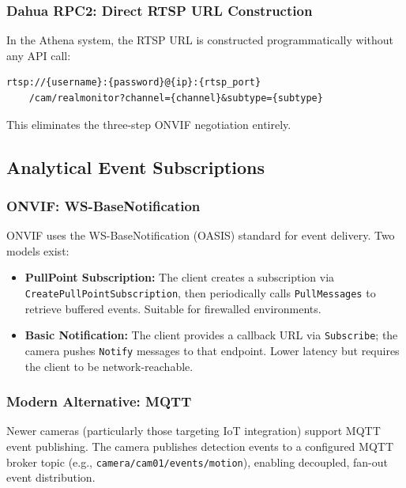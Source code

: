 \documentclass[12pt,a4paper]{article}
\begin{document}
\subsubsection{Dahua RPC2: Direct RTSP URL Construction}
In the Athena system, the RTSP URL is constructed programmatically without any API call:
\begin{lstlisting}[style=jsonstyle, caption=Programmatic RTSP URL Construction (Python)]
rtsp://{username}:{password}@{ip}:{rtsp_port}
    /cam/realmonitor?channel={channel}&subtype={subtype}
\end{lstlisting}
This eliminates the three-step ONVIF negotiation entirely.

\subsection{Analytical Event Subscriptions}

\subsubsection{ONVIF: WS-BaseNotification}
ONVIF uses the WS-BaseNotification (OASIS) standard for event delivery. Two models exist:
\begin{itemize}
    \item \textbf{PullPoint Subscription:} The client creates a subscription via \texttt{CreatePullPointSubscription}, then periodically calls \texttt{PullMessages} to retrieve buffered events. Suitable for firewalled environments.
    \item \textbf{Basic Notification:} The client provides a callback URL via \texttt{Subscribe}; the camera pushes \texttt{Notify} messages to that endpoint. Lower latency but requires the client to be network-reachable.
\end{itemize}

\subsubsection{Modern Alternative: MQTT}
Newer cameras (particularly those targeting IoT integration) support MQTT event publishing. The camera publishes detection events to a configured MQTT broker topic (e.g., \texttt{camera/cam01/events/motion}), enabling decoupled, fan-out event distribution.


\end{document}
